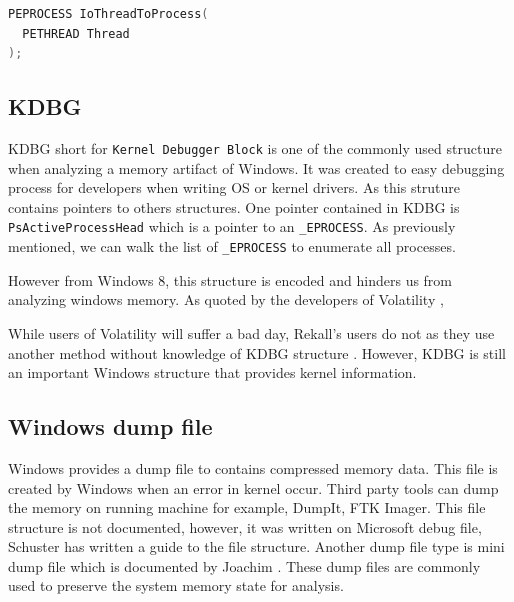 \begin{lstlisting}[language=c,caption={IoThreadToProcess},label={lst:threadtoprocess}]
PEPROCESS IoThreadToProcess(
  PETHREAD Thread
);
\end{lstlisting}

\subsection[KDBG]{KDBG}

KDBG short for \texttt{Kernel Debugger Block} is one of the commonly used structure when analyzing a memory artifact of Windows. It was created to easy debugging process for developers when writing OS or kernel drivers. As this struture contains pointers to others structures. One pointer contained in KDBG is \texttt{PsActiveProcessHead} which is a pointer to an \texttt{\_EPROCESS}. As previously mentioned, we can walk the list of \texttt{\_EPROCESS} to enumerate all processes.


However from Windows 8, this structure is encoded and hinders us from analyzing windows memory. As quoted by the developers of Volatility \cite{kdbgEncoded},


While users of Volatility will suffer a bad day, Rekall's users do not as they use another method without knowledge of KDBG structure \cite{rekallOnKDBGEncoding}. However, KDBG is still an important Windows structure that provides kernel information.

\subsection[Windows dump file]{Windows dump file}

Windows provides a dump file to contains compressed memory data. This file is created by Windows when an error in kernel occur. Third party tools can dump the memory on running machine for example, DumpIt, FTK Imager. This file structure is not documented, however, it was written on Microsoft debug file, Schuster \cite{dmpfile} has written a guide to the file structure. Another dump file type is mini dump file which is documented by Joachim \cite{mdmpfile}. These dump files are commonly used to preserve the system memory state for analysis.

